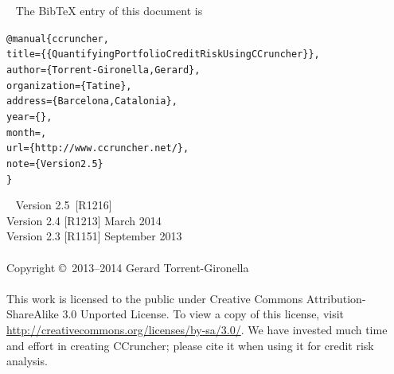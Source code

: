 \documentclass[11pt,fleqn]{book} %
\def\numversion{2.5}
\def\svnversion{R1216}
\begin{document}

~\vfill
The BibTeX entry of this document is
\begin{alltt}
@manual\{ccruncher,
    title = \{\{Quantifying Portfolio Credit Risk Using CCruncher\}\},
    author = \{Torrent-Gironella, Gerard\},
    organization = \{Tatine\},
    address = \{Barcelona, Catalonia\},
    year = \{\the\year\}, 
    month = \shortmonthname,
    url = \{http://www.ccruncher.net/\},
    note = \{Version \numversion\}
\}
\end{alltt}

~\vfill
\thispagestyle{empty}
\noindent Version \numversion\ [\svnversion] \monthname\ \the\year\\ 
\noindent Version 2.4 [R1213] March 2014\\ 
\noindent Version 2.3 [R1151] September 2013\\ 
\\
\noindent Copyright \copyright\ 2013--2014 Gerard Torrent-Gironella\\
\\
\noindent 
This work is licensed to the public under Creative Commons 
Attribution-ShareAlike 3.0 Unported License. To view a copy 
of this license, visit 
\url{http://creativecommons.org/licenses/by-sa/3.0/}.
We have invested much time and effort in creating CCruncher; 
please cite it when using it for credit risk analysis.


\pagestyle{empty}
\setcounter{tocdepth}{1}
\tableofcontents
\cleardoublepage
\pagestyle{fancy}
\end{document}
